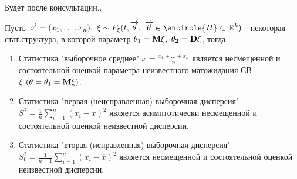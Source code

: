 \begin{example}
    Будет после консультации..
\end{example}

\begin{proofs}
  Пусть $\overrightarrow{x} = (x_1,\ldots,x_n), \ \xi \sim F_{\xi}(t, \overrightarrow{\theta}, \
  \overrightarrow{\theta} \in \encircle{H} \subset \mathbb{R}^k)$ - некоторая стат.структура, в которой параметр $\theta_1 = \bf{M}\xi, \
  \theta_2 = \bf{D}\xi$, тогда
  \begin{enumerate}
      \item Статистика "выборочное среднее" $\overline{x} = \frac{x_1 + \ldots + x_n}{n}$ является несмещенной и состоятельной
      оценкой параметра неизвестного матожидания СВ $\xi \ (\theta = \theta_1=\bf{M}\xi)$.
      \item Статистика "первая (неисправленная) выборочная дисперсия" $S^2 = \frac{1}{n}\sum\limits_{i=1}^n(x_i-\overline{x})^2$
      является асимптотически несмещенной и состоятельной оценкой неизвестной дисперсии.
      \item Статистика "вторая (исправленная) выборочная дисперсия" $S_0^2 = \frac{1}{n-1}\sum\limits_{i=1}^n(x_i-\overline{x})^2$
      является несмещенной и состоятельной оценкой неизвестной дисперсии.
  \end{enumerate}


\end{proofs}
